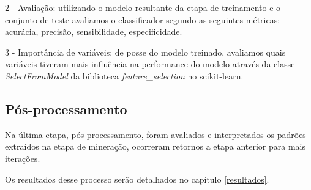 2 - Avaliação: utilizando o modelo resultante da etapa de treinamento e o conjunto
de teste avaliamos o classificador segundo as seguintes métricas: acurácia,
precisão, sensibilidade, especificidade.

3 - Importância de variáveis: de posse do modelo treinado, avaliamos quais variáveis
tiveram mais influência na performance do modelo através da classe
\textit{SelectFromModel} da biblioteca \textit{feature\_selection} no
scikit-learn.

\subsection{Pós-processamento}

Na última etapa, pós-processamento, foram avaliados e interpretados os padrões
extraídos na etapa de mineração, ocorreram retornos a etapa anterior para mais
iterações.

Os resultados desse processo serão detalhados no capítulo \ref{resultados}.
